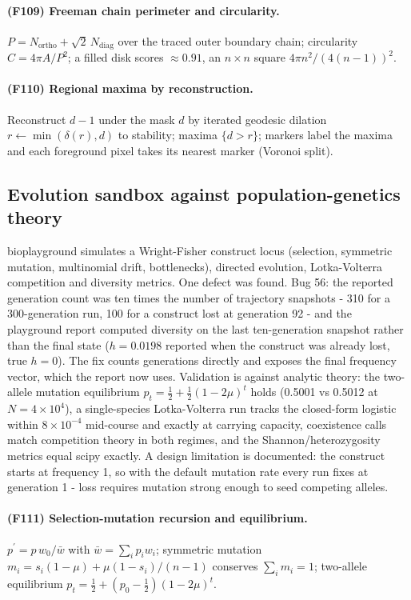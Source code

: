 \paragraph{(F109) Freeman chain perimeter and circularity.} $P=N_{\mathrm{ortho}}+\sqrt2\,N_{\mathrm{diag}}$ over the traced outer boundary chain; circularity $C=4\pi A/P^{2}$; a filled disk scores $\approx0.91$, an $n\times n$ square $4\pi n^{2}/(4(n-1))^{2}$.
\paragraph{(F110) Regional maxima by reconstruction.} Reconstruct $d-1$ under the mask $d$ by iterated geodesic dilation $r\leftarrow\min(\delta(r),d)$ to stability; maxima $\{d>r\}$; markers label the maxima and each foreground pixel takes its nearest marker (Voronoi split).
\subsection{Evolution sandbox against population-genetics theory}
bioplayground simulates a Wright-Fisher construct locus (selection, symmetric mutation, multinomial drift, bottlenecks), directed evolution, Lotka-Volterra competition and diversity metrics. One defect was found. Bug 56: the reported generation count was ten times the number of trajectory snapshots - 310 for a 300-generation run, 100 for a construct lost at generation 92 - and the playground report computed diversity on the last ten-generation snapshot rather than the final state ($h=0.0198$ reported when the construct was already lost, true $h=0$). The fix counts generations directly and exposes the final frequency vector, which the report now uses. Validation is against analytic theory: the two-allele mutation equilibrium $p_t=\frac12+\frac12(1-2\mu)^t$ holds (0.5001 vs 0.5012 at $N=4\times10^4$), a single-species Lotka-Volterra run tracks the closed-form logistic within $8\times10^{-4}$ mid-course and exactly at carrying capacity, coexistence calls match competition theory in both regimes, and the Shannon/heterozygosity metrics equal scipy exactly. A design limitation is documented: the construct starts at frequency 1, so with the default mutation rate every run fixes at generation 1 - loss requires mutation strong enough to seed competing alleles.
\paragraph{(F111) Selection-mutation recursion and equilibrium.} $p^\prime=p\,w_0/\bar w$ with $\bar w=\sum_i p_i w_i$; symmetric mutation $m_i=s_i(1-\mu)+\mu(1-s_i)/(n-1)$ conserves $\sum_i m_i=1$; two-allele equilibrium $p_t=\frac12+(p_0-\frac12)(1-2\mu)^t$.
